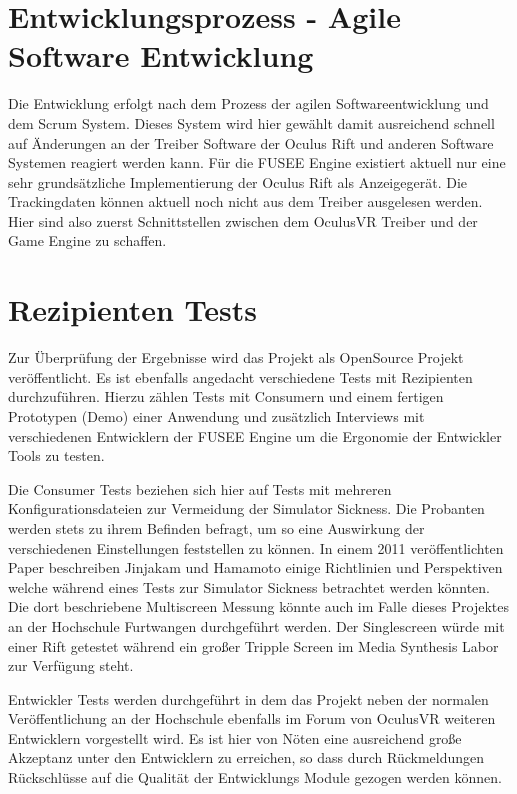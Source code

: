\documentclass[pagesize, paper=a4, fontsize=12pt,titlepage=true, headings=small, headnosepline, abstractoff, liststotoc, nochapterprefix, plainheadsepline, twoside]{scrreprt}
\begin{document}
\section{Entwicklungsprozess - Agile Software Entwicklung}
Die Entwicklung erfolgt nach dem Prozess der agilen Softwareentwicklung und dem Scrum System. Dieses System wird hier gewählt damit ausreichend schnell auf Änderungen an der Treiber Software der Oculus Rift und anderen Software Systemen reagiert werden kann. Für die FUSEE Engine existiert aktuell nur eine sehr grundsätzliche Implementierung der Oculus Rift als Anzeigegerät. Die Trackingdaten können aktuell noch nicht aus dem Treiber ausgelesen werden. Hier sind also zuerst Schnittstellen zwischen dem OculusVR Treiber und der Game Engine zu schaffen. 

\section{Rezipienten Tests}
Zur Überprüfung der Ergebnisse wird das Projekt als OpenSource Projekt veröffentlicht. Es ist ebenfalls angedacht verschiedene Tests mit Rezipienten durchzuführen. Hierzu zählen Tests mit Consumern und einem fertigen Prototypen (Demo) einer Anwendung und zusätzlich Interviews mit verschiedenen Entwicklern der FUSEE Engine um die Ergonomie der Entwickler Tools zu testen.

Die Consumer Tests beziehen sich hier auf Tests mit mehreren Konfigurationsdateien zur Vermeidung der Simulator Sickness. Die Probanten werden stets zu ihrem Befinden befragt, um so eine Auswirkung der verschiedenen Einstellungen feststellen zu können. In einem 2011 veröffentlichten Paper beschreiben Jinjakam und Hamamoto \cite{JinjakamHamamoto2011} einige Richtlinien und Perspektiven welche während eines Tests zur Simulator Sickness betrachtet werden könnten. Die dort beschriebene Multiscreen Messung könnte auch im Falle dieses Projektes an der Hochschule Furtwangen durchgeführt werden. Der Singlescreen würde mit einer Rift getestet während ein großer Tripple Screen im Media Synthesis Labor zur Verfügung steht.

Entwickler Tests werden durchgeführt in dem das Projekt neben der normalen Veröffentlichung an der Hochschule ebenfalls im Forum von OculusVR weiteren Entwicklern vorgestellt wird. Es ist hier von Nöten eine ausreichend große Akzeptanz unter den Entwicklern zu erreichen, so dass durch Rückmeldungen Rückschlüsse auf die Qualität der Entwicklungs Module gezogen werden können. 
\end{document}
